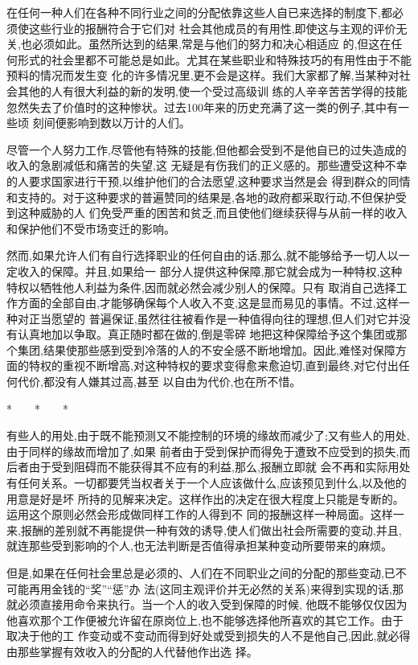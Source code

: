 ﻿\documentclass[12pt]{article}
\begin{document}
在任何一种人们在各种不同行业之间的分配依靠这些人自已来选择的制度下,都必须使这些行业的报酬符合于它们对
社会其他成员的有用性,即使这与主观的评价无关,也必须如此。虽然所达到的结果,常是与他们的努力和决心相适应
的,但这在任何形式的社会里都不可能总是如此。尤其在某些职业和特殊技巧的有用性由于不能预料的情况而发生变
化的许多情况里,更不会是这样。我们大家都了解,当某种对社会其他的人有很大利益的新的发明,使一个受过高级训
练的人辛辛苦苦学得的技能忽然失去了价值时的这种惨状。过去100年来的历史充满了这一类的例子,其中有一些顷
刻间便影响到数以万计的人们。

尽管一个人努力工作,尽管他有特殊的技能,但他都会受到不是他自已的过失造成的收入的急剧减低和痛苦的失望,这
无疑是有伤我们的正义感的。那些遭受这种不幸的人要求国家进行干预,以维护他们的合法愿望,这种要求当然是会
得到群众的同情和支持的。对于这种要求的普遍赞同的结果是,各地的政府都采取行动,不但保护受到这种威胁的人
们免受严重的困苦和贫乏,而且使他们继续获得与从前一样的收入和保护他们不受市场变迁的影响。

然而,如果允许人们有自行选择职业的任何自由的话,那么,就不能够给予一切人以一定收入的保障。并且,如果给一
部分人提供这种保障,那它就会成为一种特权,这种特权以牺牲他人利益为条件,因而就必然会减少别人的保障。只有
取消自己选择工作方面的全部自由,才能够确保每个人收入不变,这是显而易见的事情。不过,这样一种对正当愿望的
普遍保证,虽然往往被看作是一种值得向往的理想,但人们对它并没有认真地加以争取。真正随时都在做的,倒是零碎
地把这种保障给予这个集团或那个集团,结果使那些感到受到冷落的人的不安全感不断地增加。因此,难怪对保障方
面的特权的重视不断增高,对这种特权的要求变得愈来愈迫切,直到最终,对它付出任何代价,都没有人嫌其过高,甚至
以自由为代价,也在所不惜。

*　　*　　*

有些人的用处,由于既不能预测又不能控制的环境的缘故而减少了;又有些人的用处,由于同样的缘故而增加了,如果
前者由于受到保护而得免于遭致不应受到的损失,而后者由于受到阻碍而不能获得其不应有的利益,那么,报酬立即就
会不再和实际用处有任何关系。一切都要凭当权者关于一个人应该做什么,应该预见到什么,以及他的用意是好是坏
所持的见解来决定。这样作出的决定在很大程度上只能是专断的。运用这个原则必然会形成做同样工作的人得到不
同的报酬这样一种局面。这样一来,报酬的差别就不再能提供一种有效的诱导,使人们做出社会所需要的变动,并且,
就连那些受到影响的个人,也无法判断是否值得承担某种变动所要带来的麻烦。

但是,如果在任何社会里总是必须的、人们在不同职业之间的分配的那些变动,已不可能再用金钱的``奖''``惩''办
法(这同主观评价并无必然的关系)来得到实现的话,那就必须直接用命令来执行。当一个人的收入受到保障的时候,
他既不能够仅仅因为他喜欢那个工作便被允许留在原岗位上,也不能够选择他所喜欢的其它工作。由于取决于他的工
作变动或不变动而得到好处或受到损失的人不是他自己,因此,就必得由那些掌握有效收入的分配的人代替他作出选
择。
\end{document}
